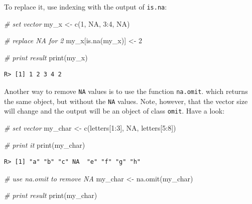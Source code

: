 \documentclass[
  12pt,
]{book}
\newenvironment{Shaded}{\begin{snugshade}}{\end{snugshade}}
\newcommand{\CommentTok}[1]{\textcolor[rgb]{0.37,0.37,0.37}{\textit{#1}}}
\newcommand{\ConstantTok}[1]{\textcolor[rgb]{0,0,0}{#1}}
\newcommand{\DecValTok}[1]{\textcolor[rgb]{0.06,0.06,0.06}{#1}}
\newcommand{\FunctionTok}[1]{\textcolor[rgb]{0,0,0}{#1}}
\newcommand{\NormalTok}[1]{#1}
\newcommand{\OtherTok}[1]{\textcolor[rgb]{0.37,0.37,0.37}{#1}}
\newcommand{\SpecialCharTok}[1]{\textcolor[rgb]{0,0,0}{#1}}
\begin{document}
To replace it, use indexing with the output of \texttt{is.na}:

\begin{Shaded}
\begin{Highlighting}[]
\CommentTok{\# set vector}
\NormalTok{my\_x }\OtherTok{\textless{}{-}} \FunctionTok{c}\NormalTok{(}\DecValTok{1}\NormalTok{, }\ConstantTok{NA}\NormalTok{, }\DecValTok{3}\SpecialCharTok{:}\DecValTok{4}\NormalTok{, }\ConstantTok{NA}\NormalTok{)}

\CommentTok{\# replace NA for 2}
\NormalTok{my\_x[}\FunctionTok{is.na}\NormalTok{(my\_x)] }\OtherTok{\textless{}{-}} \DecValTok{2}

\CommentTok{\# print result}
\FunctionTok{print}\NormalTok{(my\_x)}
\end{Highlighting}
\end{Shaded}

\begin{verbatim}
R> [1] 1 2 3 4 2
\end{verbatim}

Another way to remove \texttt{NA} values is to use the function \texttt{na.omit}. which returns the same object, but without the \texttt{NA} values. Note, however, that the vector size will change and the output will be an object of class \texttt{omit}. Have a look:  

\begin{Shaded}
\begin{Highlighting}[]
\CommentTok{\# set vector}
\NormalTok{my\_char }\OtherTok{\textless{}{-}} \FunctionTok{c}\NormalTok{(letters[}\DecValTok{1}\SpecialCharTok{:}\DecValTok{3}\NormalTok{], }\ConstantTok{NA}\NormalTok{, letters[}\DecValTok{5}\SpecialCharTok{:}\DecValTok{8}\NormalTok{])}

\CommentTok{\# print it}
\FunctionTok{print}\NormalTok{(my\_char)}
\end{Highlighting}
\end{Shaded}

\begin{verbatim}
R> [1] "a" "b" "c" NA  "e" "f" "g" "h"
\end{verbatim}

\begin{Shaded}
\begin{Highlighting}[]
\CommentTok{\# use na.omit to remove NA}
\NormalTok{my\_char }\OtherTok{\textless{}{-}} \FunctionTok{na.omit}\NormalTok{(my\_char)}

\CommentTok{\# print result}
\FunctionTok{print}\NormalTok{(my\_char)}
\end{Highlighting}
\end{Shaded}
\end{document}
